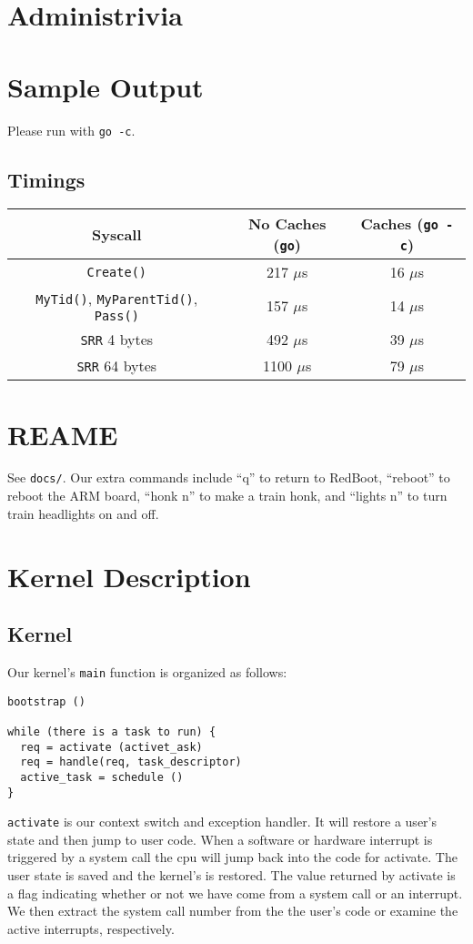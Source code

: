 \documentclass{article}
\begin{document}
\section{Administrivia}

\section{Sample Output}
Please run with \texttt{go -c}.

\subsection{Timings}
\begin{tabular}{|c|c|c|}
\hline
Syscall & No Caches (\texttt{go}) & Caches (\texttt{go -c}) \\
\hline
\hline
\texttt{Create()} & 217 $\mu$s & 16 $\mu$s \\
\hline
\texttt{MyTid()}, \texttt{MyParentTid()}, \texttt{Pass()} & 157 $\mu$s & 14 $\mu$s \\
\hline
\texttt{SRR} 4 bytes & 492 $\mu$s & 39 $\mu$s \\
\hline
\texttt{SRR} 64 bytes & 1100 $\mu$s & 79 $\mu$s \\
\hline
\end{tabular}

\section{REAME}
See \texttt{docs/}. Our extra commands include ``q'' to return to RedBoot,
``reboot'' to reboot the ARM board, ``honk n'' to make a train honk, and
``lights n'' to turn train headlights on and off.

\section{Kernel Description}

\subsection{Kernel}
Our kernel's \texttt{main} function is organized as follows:
\begin{verbatim}
bootstrap () 

while (there is a task to run) { 
  req = activate (activet_ask) 
  req = handle(req, task_descriptor) 
  active_task = schedule () 
} 
\end{verbatim}
\texttt{activate} is our context switch and exception handler. It will restore a
user's state and then jump to user code. When a software or hardware interrupt is
triggered by a system call the cpu will jump back into the code for activate.
The user state is saved and the kernel's is restored. The value returned by
activate is a flag indicating whether or not we have come from a system call or
an interrupt. We then extract the system call number from the the user's code or
examine the active interrupts, respectively.
\end{document}
